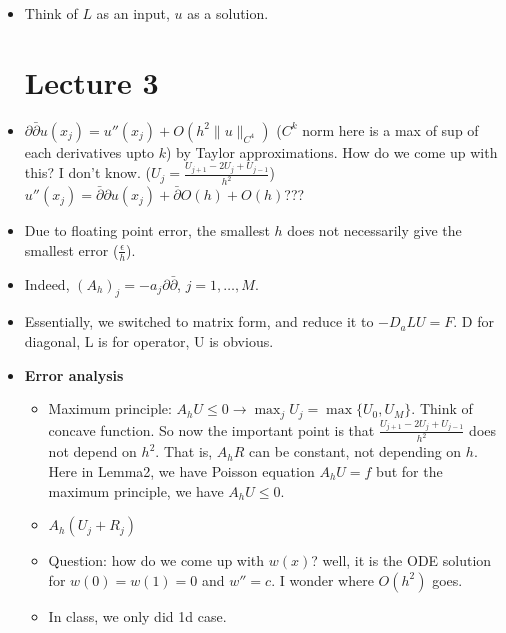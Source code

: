 \documentclass{article}
\newtheorem{theorem}{Theorem}
\theoremstyle{remark}
\newtheorem{example}{Example}
\begin{document}
\begin{itemize}
\begin{example}
If $A$ is symmetric, $\alpha=\lvert \lambda_n\rvert = \sigma_n$. Note that symmetric matrix is orthogonally diagonalizable;$A=V\Sigma V^T$, and eigenvalue can be negative.
\end{example}
Important note for symmetric positive definite matrix (\url{https://math.stackexchange.com/questions/1808799/positive-definite-if-and-only-if-determinants-are-positive}).
\begin{theorem}
Let $a$ be positive symmetric bounded bilinear form. If and only if condition for the solution $u$ where $a(u,v)=L(v) : F(u)\leq F(v)$ for some function $F(v)=\frac 12a(v,v)-L(v)$ for every $v\in H$.
\end{theorem}
\begin{theorem}
(Lax-Milgram)
Inner product on $H$ is not the same as bilinear form. Aso, there is no relationship whatsoever between bilinear form and linear functional except that they are on the same space. $u$ is unique
\end{theorem}
\item Think of $L$ as an input, $u$ as a solution.

\section*{Lecture 3}
    \item $\partial\bar\partial u(x_j)=u''(x_j)+O(h^2\lVert u\rVert_{C^4})$ ($C^k$ norm here is a max of sup of each derivatives upto $k$) by Taylor approximations. How do we come up with this? I don't know. ($U_j=\frac{U_{j+1}-2U_j+U_{j-1}}{h^2}$)
    $u''(x_j)=\bar\partial\partial u(x_j)+\bar\partial O(h)+O(h)$???
    \item Due to floating point error, the smallest $h$ does not necessarily give the smallest error ($\frac \epsilon h$).
    
    \item Indeed, $(A_h)_j=-a_j\partial\bar\partial$, $j=1,\dots, M$.
    \item Essentially, we switched to matrix form, and reduce it to $-D_a LU=F$. D for diagonal, L is for operator, U is obvious.
    \item \textbf{Error analysis}
    \begin{itemize}
        \item Maximum principle: $A_hU\leq 0\to \max_j U_j=\max\{U_0,U_M\}$. Think of concave function. So now the important point is that $\frac {U_{j+1}-2U_j+U_{j-1}}{h^2}$ does not depend on $h^2$.  That is, $A_h R$ can be constant, not depending on $h$. Here in Lemma2, we have Poisson equation $A_h U=f$ but for the maximum principle, we have $A_h U\leq 0$.
        \item $A_h(U_j+R_j)$
        \item Question: how do we come up with $w(x)$? well, it is the ODE solution for $w(0)=w(1)=0$ and $w''=c$. I wonder where $O(h^2)$ goes.
        \item In class, we only did 1d case.
    \end{itemize}


\end{itemize}
\end{document}

